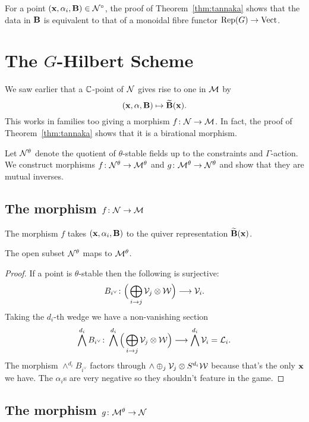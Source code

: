 \documentclass{amsart}
\theoremstyle{definition}
\begin{document}
\begin{remark}
For a point $(\mathbf{x}, \alpha_i, \mathbf{B}) \in \mathcal{N}^\circ$, the proof of Theorem~\ref{thm:tannaka} shows that the data in $\mathbf{B}$ is equivalent to that of a monoidal fibre functor $\operatorname{Rep}(G) \rightarrow \operatorname{Vect}$.
\end{remark}

\section{The $G$-Hilbert Scheme}

We saw earlier that a $\mathbb{C}$-point of $\mathcal{N}$ gives rise to one in $\mathcal{M}$ by $$(\mathbf{x}, \alpha, \mathbf{B}) \mapsto \widetilde{\mathbf{B}}(\mathbf{x}).$$
This works in families too giving a morphism $f \colon \mathcal{N} \rightarrow \mathcal{M}$.
In fact, the proof of Theorem~\ref{thm:tannaka} shows that it is a birational morphism.

Let $\mathcal{N}^\theta$ denote the quotient of $\theta$-stable fields up to the constraints and $\Gamma$-action.
We construct morphisms $f \colon \mathcal{N}^\theta \rightarrow \mathcal{M}^\theta$ and $g \colon \mathcal{M}^\theta \rightarrow \mathcal{N}^\theta$ and show that they are mutual inverses.

\subsection{The morphism $f \colon \mathcal{N} \rightarrow \mathcal{M}$}

The morphism $f$ takes $(\mathbf{x}, \alpha_i, \mathbf{B})$ to the quiver representation $\widetilde{\mathbf{B}}(\mathbf{x})$.

\begin{lemma}
The open subset $\mathcal{N}^\theta$ maps to $\mathcal{M}^\theta$.
\end{lemma}

\begin{proof}
If a point is $\theta$-stable then the following is surjective:
$$B_{i^\vee} \colon \Big(\bigoplus_{i \rightarrow j} \mathcal{V}_j  \otimes \mathcal{W} \Big) \longrightarrow \mathcal{V}_i.$$
Taking the $d_i$-th wedge we have a non-vanishing section 
$$\bigwedge^{d_i} B_{i^\vee} \colon \bigwedge^{d_i} \Big(\bigoplus_{i \rightarrow j} \mathcal{V}_j \otimes \mathcal{W} \Big) \longrightarrow \bigwedge^{d_i} \mathcal{V}_i = \mathcal{L}_i.$$
The morphism $\wedge^{d_i} B_{i^\vee}$ factors through $\wedge \oplus_j \mathcal{V}_j \otimes S^{d_i} \mathcal{W}$ because that's the only $\mathbf{x}$ we have.
The $\alpha_i$s are very negative so they shouldn't feature in the game.
\end{proof}

\subsection{The morphism $g \colon \mathcal{M}^\theta \rightarrow \mathcal{N}$}
\end{document}
